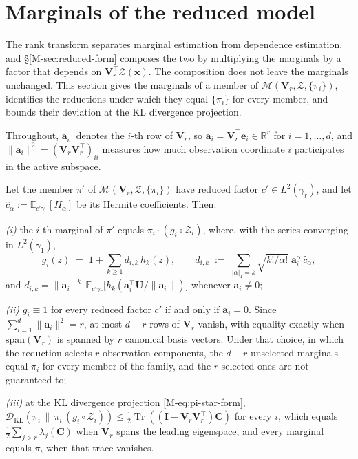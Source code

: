 \documentclass[supplement,review,hidelinks,onefignum,onetabnum]{siamart251216}
\newcommand{\RR}{\mathbb{R}}
\newcommand{\EE}{\mathbb{E}}
\newcommand{\tr}{\operatorname{Tr}}
\newcommand{\DKL}{\mathcal{D}_{\mathrm{KL}}}
\newcommand{\gauss}{\gamma}
\newcommand{\mC}{\bm{C}}
\newcommand{\mV}{\bm{V}}
\newcommand{\mI}{\bm{I}}
\newcommand{\vx}{\bm{x}}
\newcommand{\vU}{\bm{U}}
\newcommand{\scZ}{\mathcal{Z}}
\newcommand{\va}{\bm{a}}
\newcommand{\ve}{\bm{e}}
\begin{document}
\section{Marginals of the reduced model}
\label{sm:marginals}

The rank transform separates marginal estimation from dependence estimation, and \S\ref{M-sec:reduced-form} composes the two by multiplying the marginals by a factor that depends on $\mV_r^\top\scZ(\vx)$. The composition does not leave the marginals unchanged. This section gives the marginals of a member of $\mathcal M(\mV_r, \scZ, \{\pi_i\})$, identifies the reductions under which they equal $\{\pi_i\}$ for every member, and bounds their deviation at the KL divergence projection.

Throughout, $\va_i^\top$ denotes the $i$-th row of $\mV_r$, so $\va_i = \mV_r^\top\ve_i \in \RR^r$ for $i = 1, \ldots, d$, and $\|\va_i\|^2 = (\mV_r\mV_r^\top)_{ii}$ measures how much observation coordinate $i$ participates in the active subspace.

\begin{proposition}
\label{prop:sm-marginals}
Let the member $\pi'$ of $\mathcal M(\mV_r, \scZ, \{\pi_i\})$ have reduced factor $c' \in L^2(\gauss_r)$, and let $\widehat c_\alpha := \EE_{c'\gauss_r}[H_\alpha]$ be its Hermite coefficients. Then:

\emph{(i)} the $i$-th marginal of $\pi'$ equals $\pi_i \cdot (g_i\circ\scZ_i)$, where, with the series converging in $L^2(\gauss_1)$,
\begin{equation}
  g_i(z) \;=\; 1 + \sum_{k\ge1} d_{i,k}\,h_k(z),
  \qquad
  d_{i,k} \;:=\; \sum_{|\alpha|_1 = k}\sqrt{k!/\alpha!}\;\va_i^{\alpha}\,\widehat c_\alpha,
  \label{eq:sm-marginal-drift}
\end{equation}
and $d_{i,k} = \|\va_i\|^k\,\EE_{c'\gauss_r}\bigl[h_k(\va_i^\top\vU/\|\va_i\|)\bigr]$ whenever $\va_i \neq 0$;

\emph{(ii)} $g_i \equiv 1$ for every reduced factor $c'$ if and only if $\va_i = 0$. Since $\sum_{i=1}^d\|\va_i\|^2 = r$, at most $d-r$ rows of $\mV_r$ vanish, with equality exactly when $\mathrm{span}(\mV_r)$ is spanned by $r$ canonical basis vectors. Under that choice, in which the reduction selects $r$ observation components, the $d-r$ unselected marginals equal $\pi_i$ for every member of the family, and the $r$ selected ones are not guaranteed to;

\emph{(iii)} at the KL divergence projection \eqref{M-eq:pi-star-form}, $\DKL(\pi_i\,\|\,\pi_i\,(g_i\circ\scZ_i)) \le \tfrac12\tr((\mI - \mV_r\mV_r^\top)\mC)$ for every $i$, which equals $\tfrac12\sum_{j>r}\lambda_j(\mC)$ when $\mV_r$ spans the leading eigenspace, and every marginal equals $\pi_i$ when that trace vanishes.
\end{proposition}
\end{document}
